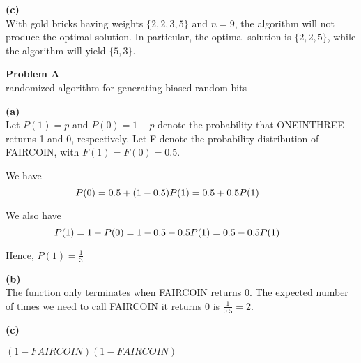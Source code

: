 \documentclass[12pt,article]{article}
\newcommand\tab[1][1cm]{\hspace*{#1}}
\newenvironment{problem}[2][Problem]
    { \begin{mdframed}[backgroundcolor=gray!20] \textbf{#1 #2} \\}
    {  \end{mdframed}}
\begin{document}



\textbf{(c)} \\
With gold bricks having weights $\{2,2,3,5\}$ and $n = 9$, the algorithm will not produce the optimal solution. In particular, the optimal solution is $\{2,2,5\}$, while the algorithm will yield $\{5,3\}$.

\newpage
\begin{problem}{3} 
A randomized algorithm for generating biased random bits
\end{problem}

\textbf{(a)} \\
Let $P(1) = p$ and $P(0) = 1 - p$ denote the probability that ONEINTHREE returns 1 and 0, respectively. Let F denote the probability distribution of FAIRCOIN, with $F(1) = F(0) = 0.5$.

We have 
$$P(0) = 0.5 + (1 - 0.5)P(1) = 0.5 + 0.5P(1) \tab[1cm]$$  

We also have
$$P(1) = 1 - P(0) = 1 - 0.5 - 0.5P(1) = 0.5 - 0.5P(1) \tab[1cm]$$ 

Hence, $P(1) = \frac{1}{3}$

\textbf{(b)} \\
The function only terminates when FAIRCOIN returns 0. The expected number of times we need to call FAIRCOIN it returns 0 is $\frac{1}{0.5} = 2$.

\textbf{(c)}

\begin{algorithm}
\caption{$FAIRCOIN$}\label{alg:q3}
\begin{algorithmic}
    \Else
        \Return $(1 - FAIRCOIN)(1 - FAIRCOIN)$
    \EndIf
\end{algorithmic}
\end{algorithm}
\end{document}
